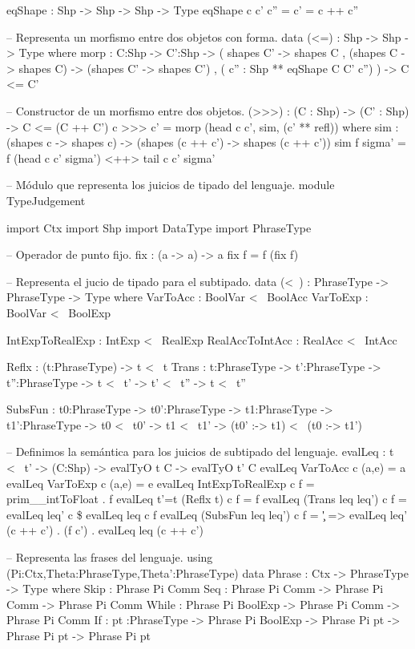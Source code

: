 \begin{code}
eqShape : Shp -> Shp -> Shp -> Type
eqShape c c' c'' = c' = c ++ c''

-- Representa un morfismo entre dos objetos con forma.
data (<=) : Shp -> Shp -> Type where 
        morp : {C:Shp} -> {C':Shp} -> 
               ( shapes C' -> shapes C
               , (shapes C -> shapes C) -> (shapes C' -> shapes C')
               , ( c'' : Shp ** eqShape C C' c'')
               ) -> C <= C'

-- Constructor de un morfismo entre dos objetos.
(>>>) : (C : Shp) -> (C' : Shp) -> C <= (C ++ C')
c >>> c' = morp (head c c', sim, (c' ** refl))
    where
        sim : (shapes c -> shapes c) -> (shapes (c ++ c') -> shapes (c ++ c'))
        sim f sigma' = f (head c c' sigma') <++> tail c c' sigma'

-- Módulo que representa los juicios de tipado del lenguaje.
module TypeJudgement

import Ctx
import Shp
import DataType
import PhraseType

-- Operador de punto fijo.
fix : (a -> a) -> a
fix f = f (fix f)

-- Representa el jucio de tipado para el subtipado.
data (<~) : PhraseType -> PhraseType -> Type where
    VarToAcc : BoolVar <~ BoolAcc
    VarToExp : BoolVar <~ BoolExp
    
    IntExpToRealExp : IntExp <~ RealExp
    RealAccToIntAcc : RealAcc <~ IntAcc
    
    Reflx : (t:PhraseType) -> t <~ t
    Trans : {t:PhraseType} -> {t':PhraseType} -> {t'':PhraseType} -> 
            t <~ t' -> t' <~ t'' -> t <~ t''
    
    SubsFun : {t0:PhraseType} -> {t0':PhraseType} -> 
              {t1:PhraseType} -> {t1':PhraseType} -> 
              t0 <~ t0' -> t1 <~ t1' -> (t0' :-> t1) <~ (t0 :-> t1')

-- Definimos la semántica para los juicios de subtipado del lenguaje.
evalLeq : t <~ t' -> (C:Shp) -> evalTyO t C -> evalTyO t' C
evalLeq VarToAcc c (a,e)    = a
evalLeq VarToExp c (a,e)    = e
evalLeq IntExpToRealExp c f = prim__intToFloat . f
evalLeq {t'=t} (Reflx t) c f = f
evalLeq (Trans leq leq') c f = evalLeq leq' c \$ evalLeq leq c f
evalLeq (SubsFun leq leq') c f = \c' => evalLeq leq' (c ++ c') . (f c') . evalLeq leq (c ++ c')

-- Representa las frases del lenguaje.
using (Pi:Ctx,Theta:PhraseType,Theta':PhraseType)
    data Phrase : Ctx -> PhraseType -> Type where
        Skip    : Phrase Pi Comm
        Seq     : Phrase Pi Comm -> Phrase Pi Comm -> Phrase Pi Comm
        While   : Phrase Pi BoolExp -> Phrase Pi Comm -> Phrase Pi Comm
        If      : {pt :PhraseType} -> Phrase Pi BoolExp -> 
                  Phrase Pi pt -> Phrase Pi pt -> Phrase Pi pt
        

\end{code}
